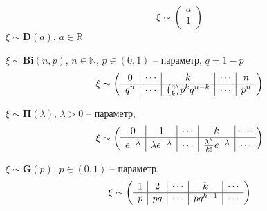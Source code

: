 \begin{defs}
	\begin{multicols}{2}
	\begin{itemize*}
			\item {}
			\[ \xi \sim \left( \begin{array}{c}
				a \\ \hline
				1 \\
			\end{array} \right) \]
			$\xi \sim \boldsymbol{D}(a)$, $a \in \mathbb{R}$
			\item {}
			$\xi \sim \boldsymbol{Bi}(n,p)$, $n \in \mathbb{N}$, $p \in (0,1)$ -- параметр, $q=1-p$
			\[ \xi \sim \left( \begin{array}{ccccc}
				0 & \multicolumn{1}{|c}{\cdots} & \multicolumn{1}{|c}{k} & \multicolumn{1}{|c}{\cdots} & \multicolumn{1}{|c}{n}\\ \hline
				q^{n} & \multicolumn{1}{|c}{\cdots} & \multicolumn{1}{|c}{\binom{n}{k}p^{k}q^{n-k}} & \multicolumn{1}{|c}{\cdots} & \multicolumn{1}{|c}{p^{n}}\\
			\end{array} \right) \]
			\item {}
			$\xi \sim \boldsymbol{\Pi}(\lambda)$, $\lambda > 0$ -- параметр,
			\[ \xi \sim \left( \begin{array}{ccccc}
				0 & \multicolumn{1}{|c}{1} & \multicolumn{1}{|c}{\cdots} & \multicolumn{1}{|c}{k} & \multicolumn{1}{|c}{\cdots}\\ \hline
				e^{-\lambda} & \multicolumn{1}{|c}{\lambda e^{-\lambda}} & \multicolumn{1}{|c}{\cdots} & \multicolumn{1}{|c}{\frac{\lambda^{k}}{k!} e^{-\lambda}} & \multicolumn{1}{|c}{\cdots}\\
			\end{array} \right) \]
			\item {}
			$\xi \sim \boldsymbol{G}(p)$, $p \in (0,1)$ -- параметр,
			\[ \xi \sim \left( \begin{array}{ccccc}
				1 & \multicolumn{1}{|c}{2} & \multicolumn{1}{|c}{\cdots} & \multicolumn{1}{|c}{k} & \multicolumn{1}{|c}{\cdots}\\ \hline
				p & \multicolumn{1}{|c}{pq} & \multicolumn{1}{|c}{\cdots} & \multicolumn{1}{|c}{pq^{k-1}} & \multicolumn{1}{|c}{\cdots}\\
			\end{array} \right) \]
	\end{itemize*}
	\end{multicols}
\end{defs}

